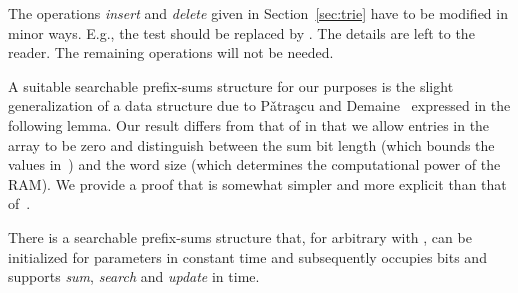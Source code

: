 \documentclass[envcountsame,envcountsect,undated,nolinenumbers]{lnthi}
\def\Tvn#1{\hbox{\textit{#1\/}}}
\begin{document}
The operations \Tvn{insert} and \Tvn{delete} given
in Section~\ref{sec:trie} have to
be modified in minor ways.
E.g., the test 
should be replaced by .
The details are left to the reader.
The remaining operations will not be needed.

A suitable searchable prefix-sums structure for our
purposes is the slight generalization of a data
structure due to
P\v atra\c scu and Demaine~\cite[Section~8]{PatD06}
expressed in the following lemma.
Our result differs from that of
\cite{PatD06} in that we allow
entries in the array  to be zero and
distinguish between the sum bit length 
(which bounds the values in~)
and the word size 
(which determines the computational power
of the RAM).
We provide a proof that is somewhat
simpler and more explicit than
that of~\cite{PatD06}.

\begin{lemma}
\label{lem:prefSum}There is a searchable prefix-sums structure that,
for arbitrary  with
, can be initialized
for parameters 
in constant time and subsequently
occupies  bits and supports
\Tvn{sum}, \Tvn{search} and \Tvn{update}
in  time.
\end{lemma}
\end{document}
